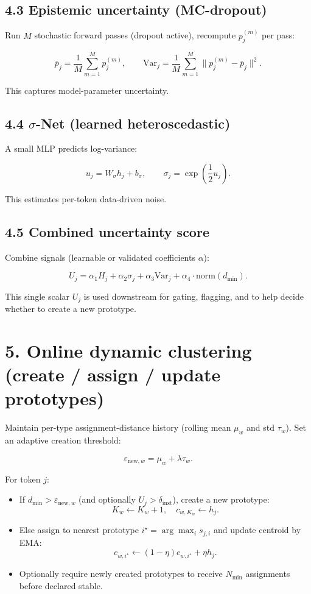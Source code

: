 \documentclass[a4paper,12pt]{article}
\begin{document}
\subsection*{4.3 Epistemic uncertainty (MC-dropout)}
Run $M$ stochastic forward passes (dropout active), recompute $p_j^{(m)}$ per pass:

\[
\bar{p}_j = \frac{1}{M} \sum_{m=1}^M p_j^{(m)}, \qquad
\text{Var}_j = \frac{1}{M} \sum_{m=1}^M \| p_j^{(m)} - \bar{p}_j \|^2.
\]

This captures model-parameter uncertainty.

\subsection*{4.4 $\sigma$-Net (learned heteroscedastic)}
A small MLP predicts log-variance:

\[
u_j = W_\sigma h_j + b_\sigma, \qquad \sigma_j = \exp\left(\frac{1}{2} u_j\right).
\]

This estimates per-token data-driven noise.

\subsection*{4.5 Combined uncertainty score}
Combine signals (learnable or validated coefficients $\alpha$):

\[
U_j = \alpha_1 H_j + \alpha_2 \sigma_j + \alpha_3 \text{Var}_j + \alpha_4 \cdot \text{norm}(d_{\min}).
\]

This single scalar $U_j$ is used downstream for gating, flagging, and to help decide whether to create a new prototype.

\section*{5. Online dynamic clustering (create / assign / update prototypes)}
Maintain per-type assignment-distance history (rolling mean $\mu_w$ and std $\tau_w$). Set an adaptive creation threshold:

\[
\varepsilon_{\text{new},w} = \mu_w + \lambda \tau_w.
\]

For token $j$:
\begin{itemize}
    \item If $d_{\min} > \varepsilon_{\text{new},w}$ (and optionally $U_j > \delta_{\text{inst}}$), create a new prototype:
    \[
    K_w \leftarrow K_w + 1, \quad c_{w,K_w} \leftarrow h_j.
    \]
    \item Else assign to nearest prototype $i^\star = \arg\max_i s_{j,i}$ and update centroid by EMA:
    \[
    c_{w,i^\star} \leftarrow (1-\eta) c_{w,i^\star} + \eta h_j.
    \]
    \item Optionally require newly created prototypes to receive $N_{\min}$ assignments before declared stable.
\end{itemize}
\end{document}
